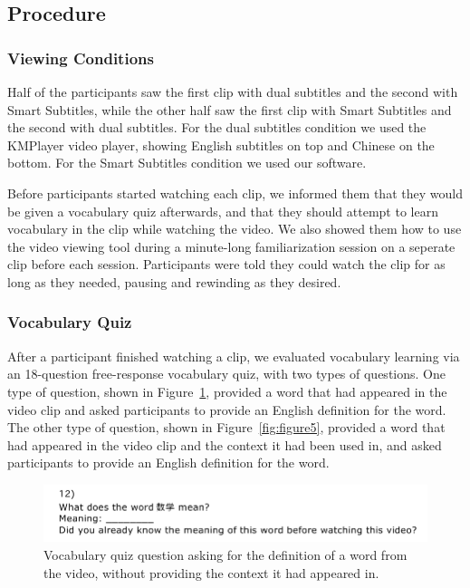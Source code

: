 \documentclass{sigchi}
\begin{document}
\subsection{Procedure}

\subsubsection{Viewing Conditions}

Half of the participants saw the first clip with dual
subtitles and the second with Smart Subtitles, while the
other half saw the first clip with Smart Subtitles and
the second with dual subtitles.
For the dual subtitles
condition we used the KMPlayer video player, showing English subtitles
on top and Chinese on the bottom. For the Smart
Subtitles condition we used our software.

Before participants started watching each clip, we
informed them that they would be given a vocabulary
quiz afterwards, and that they should attempt to learn vocabulary
in the clip while watching the video. We also
showed them how to use the video viewing tool
during a minute-long familiarization session on a seperate clip
before each session. Participants were told 
they could watch the clip for as long as they
needed, pausing and rewinding as they desired.

\subsubsection{Vocabulary Quiz}

After a participant finished watching a clip, we evaluated vocabulary learning via an 18-question free-response vocabulary quiz, with two types of questions. One type of question, shown in Figure~\ref{fig:figure4}, provided a word that had appeared in the video clip and asked participants to provide an English definition for the word. The other type of question, shown in Figure~\ref{fig:figure5}, provided a word that had appeared in the video clip and the context it had been used in, and asked participants to provide an English definition for the word.

\begin{figure}[!h]
\centering
\includegraphics[width=\columnwidth]{vocab-quiz-1}
\caption{Vocabulary quiz question asking for the definition
of a word from the video, without providing the context it had appeared in.}
\label{fig:figure4}
\end{figure}
\end{document}
